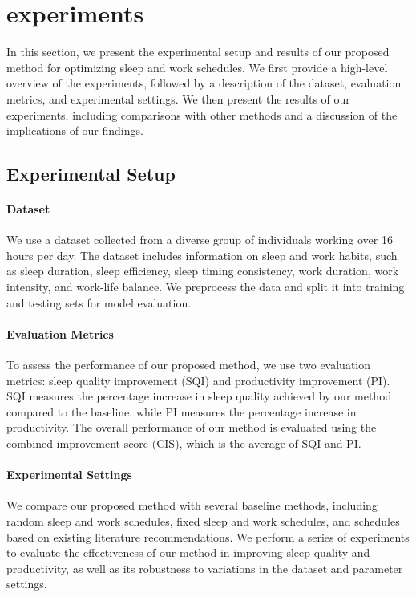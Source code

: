 \section{experiments}

In this section, we present the experimental setup and results of our proposed method for optimizing sleep and work schedules. We first provide a high-level overview of the experiments, followed by a description of the dataset, evaluation metrics, and experimental settings. We then present the results of our experiments, including comparisons with other methods and a discussion of the implications of our findings.

\subsection{Experimental Setup}

\paragraph{Dataset} We use a dataset collected from a diverse group of individuals working over 16 hours per day. The dataset includes information on sleep and work habits, such as sleep duration, sleep efficiency, sleep timing consistency, work duration, work intensity, and work-life balance. We preprocess the data and split it into training and testing sets for model evaluation.

\paragraph{Evaluation Metrics} To assess the performance of our proposed method, we use two evaluation metrics: sleep quality improvement (SQI) and productivity improvement (PI). SQI measures the percentage increase in sleep quality achieved by our method compared to the baseline, while PI measures the percentage increase in productivity. The overall performance of our method is evaluated using the combined improvement score (CIS), which is the average of SQI and PI.

\paragraph{Experimental Settings} We compare our proposed method with several baseline methods, including random sleep and work schedules, fixed sleep and work schedules, and schedules based on existing literature recommendations. We perform a series of experiments to evaluate the effectiveness of our method in improving sleep quality and productivity, as well as its robustness to variations in the dataset and parameter settings.

